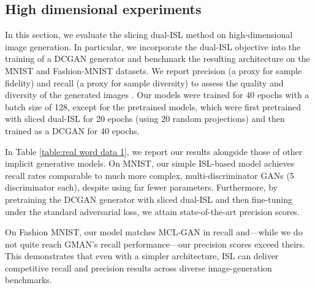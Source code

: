 \documentclass{article}
\begin{document}
\newpage \clearpage
\subsection{High dimensional experiments}

In this section, we evaluate the slicing dual-ISL method on high-dimensional image generation.  In particular, we incorporate the dual-ISL objective into the training of a DCGAN generator \cite{radford2015unsupervised} and benchmark the resulting architecture  on the MNIST and Fashion-MNIST datasets.  We report precision (a proxy for sample fidelity) and recall (a proxy for sample diversity) to assess the quality and diversity of the generated images \cite{sajjadi2018assessing}. Our models were trained for 40 epochs with a batch size of 128, except for the pretrained models, which were first pretrained with sliced dual-ISL for 20 epochs (using 20 random projections) and then trained as a DCGAN for 40 epochs.

In Table \ref{table:real word data 1}, we report our results alongside those of other implicit generative models. On MNIST, our simple ISL-based model achieves recall rates comparable to much more complex, multi-discriminator GANs \cite{durugkar2016generative, choi2022mcl} (5 discriminator each), despite using far fewer parameters. Furthermore, by pretraining the DCGAN generator with sliced dual-ISL and then fine-tuning under the standard adversarial loss, we attain state-of-the-art precision scores.

On Fashion MNIST, our model matches MCL-GAN in recall and—while we do not quite reach GMAN’s recall performance—our precision scores exceed theirs. This demonstrates that even with a simpler architecture, ISL can deliver competitive recall and precision results across diverse image-generation benchmarks.
\end{document}
